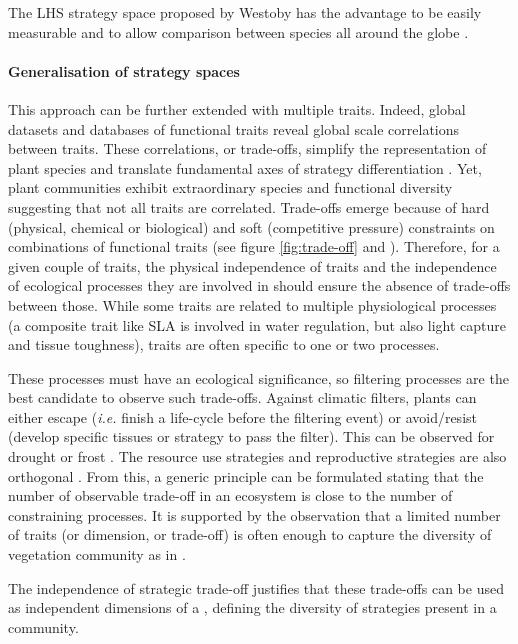 The LHS strategy space proposed by Westoby has the advantage to be easily measurable and to allow comparison between species all around the globe \parencite{pierce_allocating_2013}.

\paragraph{Generalisation of strategy spaces}
This approach can be further extended with multiple traits. Indeed, global datasets and databases of functional traits reveal global scale correlations between traits. These correlations, or trade-offs, simplify the representation of plant species \parencite{diaz_global_2016} and translate fundamental axes of strategy differentiation \parencite{reich_world-wilde_2013}. Yet, plant communities exhibit extraordinary species and functional diversity suggesting that not all traits are correlated. Trade-offs emerge because of hard (physical, chemical or biological) and soft (competitive pressure) constraints on combinations of functional traits (see figure \ref{fig:trade-off} and \cite{shipley_fundamental_2006}). Therefore, for a given couple of traits, the physical independence of traits and the independence of ecological processes they are involved in should ensure the absence of trade-offs between those. While some traits are related to multiple physiological processes (a composite trait like SLA is involved in water regulation, but also light capture and tissue toughness), traits are often specific to one or two processes.

These processes must have an ecological significance, so filtering processes are the best candidate to observe such trade-offs. Against climatic filters, plants can either escape (\textit{i.e.} finish a life-cycle before the filtering event) or avoid/resist (develop specific tissues or strategy to pass the filter). This can be observed for drought \parencite{kooyers_evolution_2015} or frost \parencite{korner_alpine_2003}. The resource use strategies and reproductive strategies are also orthogonal \parencite{diaz_global_2014}. 
From this, a generic principle can be formulated stating that the number of observable trade-off in an ecosystem is close to the number of constraining processes. It is supported by the observation that a limited number of traits (or dimension, or trade-off) is often enough to capture the diversity of vegetation community as in \cite{laughlin_intrinsic_2014}.

The independence of strategic trade-off justifies that these trade-offs can be used as independent dimensions of a , defining the diversity of strategies present in a community.


